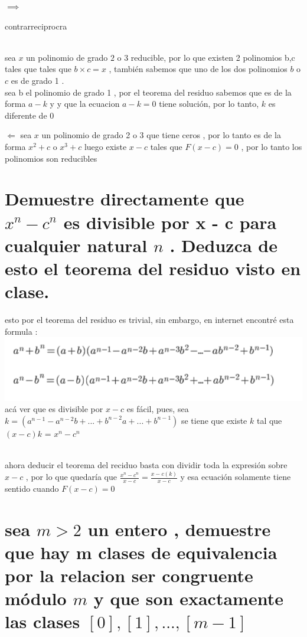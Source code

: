 \documentclass[10pt,a4paper]{article} %
\begin{document}
   $  \implies  $

        contrarreciprocra

        \\
        sea $ x  $  un polinomio de grado $ 2  $  o $ 3  $  reducible, por lo que
        existen 2 polinomios b,c tales que tales que $ b \times c   = x $ ,
        también sabemos que uno de los dos polinomios $ b   $ o $ c  $ es de
        grado 1  .
        \\ sea b el polinomio de grado 1 , por el teorema del residuo sabemos
        que es de la forma $ a - k  $ y y que la ecuacion $ a -k = 0  $ tiene
        solución, por lo tanto, $ k   $ es diferente de $ 0  $

        $ \Leftarrow  $
        sea $ x  $  un polinomio de grado 2 o 3 que tiene ceros , por lo tanto es
        de la forma $ x ^{2} + c   $  o $ x ^{3}  + c  $ luego existe $ x -c  $
        tales que $ F(x-c) = 0  $ , por lo tanto los polinomios son reducibles

    \section{Demuestre directamente que $ x ^{n} - c ^{n}   $  es divisible por
    x - c  para cualquier natural $ n  $ . Deduzca de esto el teorema del residuo visto en clase.}

        esto por el teorema del residuo es trivial, sin embargo, en internet
        encontré esta formula :
        \\ \includegraphics[width=0.8\linewidth]{internet.png}
        \\ acá ver que es divisible por $ x - c  $ es fácil, pues, sea $ k = (a
        ^{n-1} - a ^{n-2}b  + ... + b ^{n-2}a +... + b ^{n-1}    )  $ se tiene
        que existe $ k  $ tal que $ (x-c)k  $ = $ x ^{n} - c ^{n}   $

        \\ ahora deducir el teorema del reciduo basta con dividir toda la
        expresión sobre $ x-c  $ , por lo que quedaría que $ \frac{x ^{n} - c ^{n}  }{x-c} = \frac{x-c(k)}{x-c}   $
        y esa ecuación solamente tiene sentido cuando $ F(x-c)  = 0  $
        \section{sea $ m > 2  $  un entero , demuestre que hay m clases de
        equivalencia por la relacion ser congruente módulo $ m  $  y que son
        exactamente las clases $ [0] , [ 1] , ... , [m-1]  $ }
\end{document}
